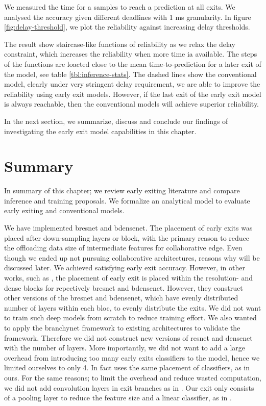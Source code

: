 We measured the time for a samples to reach a prediction at all exits. We analysed the accuracy given different deadlines with 1 ms granularity. In figure \ref{fig:delay-threshold}, we plot the reliability against increasing delay thresholds.

The result show staircase-like functions of reliability as we relax the delay constraint, which increases the reliability when more time ia available. The steps of the functions are loacted close to the mean time-to-prediction for a later exit of the model, see table \ref{tbl:inference-stats}. The dashed lines show the conventional model, clearly under very stringent delay requirement, we are able to improve the reliability using early exit models. However, if the last exit of the early exit model is always reachable, then the conventional models will achieve superior reliability. 

In the next section, we summarize, discuss and conclude our findings of investigating the early exit model capabilities in this chapter.

\section{Summary} \label{sec:ee-summary}

In summary of this chapter; we review early exiting literature and compare inference and training proposals. We formalize an analytical model to evaluate early exiting and conventional models. 

We have implemented \gls{bresnet} and \gls{bdensenet}. The placement of early exits was placed after down-sampling layers or block, with the primary reason to reduce the offloading data size of intermediate features for collaborative edge. Even though we ended up not pursuing collaborative architectures, reasons why will be discussed later. We achieved satisfying early exit accuracy. However, in other works, such as \cite{huang_multi-scale_2017}, the placement of early exit is placed within the resolution- and dense blocks for repectively \gls{bresnet} and \gls{bdensenet}. However, they construct other versions of the \gls{bresnet} and \gls{bdensenet}, which have evenly distributed number of layers within each bloc, to evenly distribute the exits. We did not want to train such deep models from scratch to reduce training effort. We also wanted to apply the \gls{branchynet} framework to existing architectures to validate the framework. Therefore we did not construct new versions of \gls{resnet} and \gls{densenet} with the number of layers. More importantly, we did not want to add a large overhead from introducing too many early exits classifiers to the model, hence we limited ourselves to only 4. In fact \cite{berestizshevsky_sacrificing_2019} uses the same placement of classifiers, as in ours. For the same reasons; to limit the overhead and reduce wasted computation, we did not add convolution layers in exit branches as in \cite{teerapittayanon_branchynet:_2016}. Our exit only consists of a pooling layer to reduce the feature size and a linear classifier, as in \cite{kaya_shallow-deep_nodate}. 

